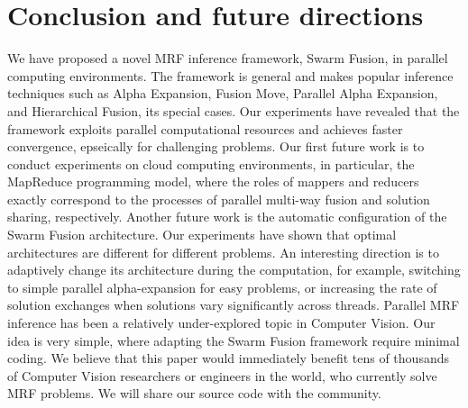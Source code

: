 \section{Conclusion and future directions}
We have proposed a novel MRF inference framework, Swarm Fusion, in
parallel computing environments. The framework is general and makes
popular inference techniques such as Alpha Expansion, Fusion Move,
Parallel Alpha Expansion, and Hierarchical Fusion, its special cases. Our
experiments have revealed that the framework exploits parallel
computational resources and achieves faster convergence, epseically for
challenging problems.  Our first future work is to conduct experiments
on cloud computing environments, in particular, the MapReduce
programming model, where the roles of mappers and reducers exactly
correspond to the processes of parallel multi-way fusion and solution
sharing, respectively.  Another future work is the automatic
configuration of the Swarm Fusion architecture.  Our experiments have
shown that optimal architectures are different for different problems.
An interesting direction is to adaptively change its architecture during
the computation, for example, switching to simple parallel
alpha-expansion for easy problems, or increasing the rate of solution
exchanges when solutions vary significantly across threads.
%
Parallel MRF inference has been a relatively under-explored topic in
Computer Vision. Our idea is very simple, where adapting the Swarm Fusion
framework require minimal coding. We believe that this paper would
immediately benefit tens of thousands of Computer Vision researchers or
engineers in the world, who currently solve MRF problems. We will share
our source code with the community.
